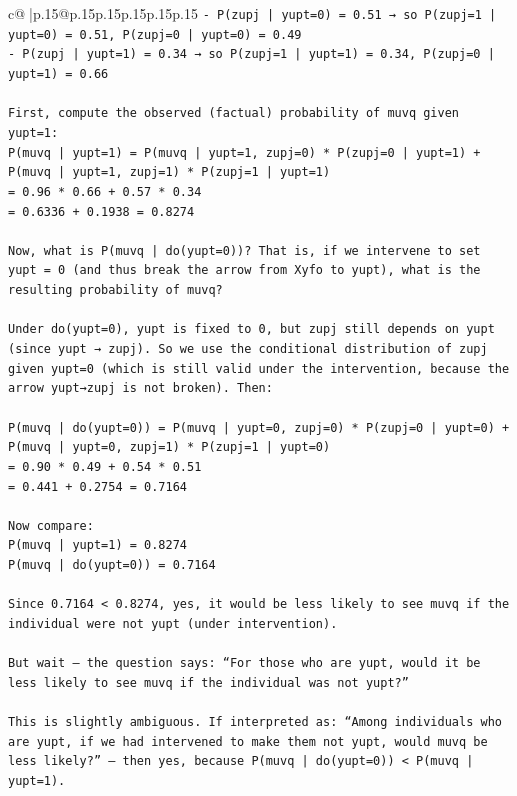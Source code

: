 \documentclass{article}
\begin{document}
{\begin{supertabular}{c@{$\;$}|p{.15\linewidth}@{}p{.15\linewidth}p{.15\linewidth}p{.15\linewidth}p{.15\linewidth}p{.15\linewidth}}
{{{\texttt{{-} P(zupj | yupt=0) = 0.51 → so P(zupj=1 | yupt=0) = 0.51, P(zupj=0 | yupt=0) = 0.49} \\
\texttt{{-} P(zupj | yupt=1) = 0.34 → so P(zupj=1 | yupt=1) = 0.34, P(zupj=0 | yupt=1) = 0.66} \\
\\ 
\texttt{First, compute the observed (factual) probability of muvq given yupt=1:} \\
\texttt{P(muvq | yupt=1) = P(muvq | yupt=1, zupj=0) * P(zupj=0 | yupt=1) + P(muvq | yupt=1, zupj=1) * P(zupj=1 | yupt=1)} \\
\texttt{= 0.96 * 0.66 + 0.57 * 0.34} \\
\texttt{= 0.6336 + 0.1938 = 0.8274} \\
\\ 
\texttt{Now, what is P(muvq | do(yupt=0))? That is, if we intervene to set yupt = 0 (and thus break the arrow from Xyfo to yupt), what is the resulting probability of muvq?} \\
\\ 
\texttt{Under do(yupt=0), yupt is fixed to 0, but zupj still depends on yupt (since yupt → zupj). So we use the conditional distribution of zupj given yupt=0 (which is still valid under the intervention, because the arrow yupt→zupj is not broken). Then:} \\
\\ 
\texttt{P(muvq | do(yupt=0)) = P(muvq | yupt=0, zupj=0) * P(zupj=0 | yupt=0) + P(muvq | yupt=0, zupj=1) * P(zupj=1 | yupt=0)} \\
\texttt{= 0.90 * 0.49 + 0.54 * 0.51} \\
\texttt{= 0.441 + 0.2754 = 0.7164} \\
\\ 
\texttt{Now compare:} \\
\texttt{P(muvq | yupt=1) = 0.8274} \\
\texttt{P(muvq | do(yupt=0)) = 0.7164} \\
\\ 
\texttt{Since 0.7164 < 0.8274, yes, it would be less likely to see muvq if the individual were not yupt (under intervention).} \\
\\ 
\texttt{But wait — the question says: “For those who are yupt, would it be less likely to see muvq if the individual was not yupt?”} \\
\\ 
\texttt{This is slightly ambiguous. If interpreted as: “Among individuals who are yupt, if we had intervened to make them not yupt, would muvq be less likely?” — then yes, because P(muvq | do(yupt=0)) < P(muvq | yupt=1).} \\
}}}
\end{supertabular}}
\end{document}
